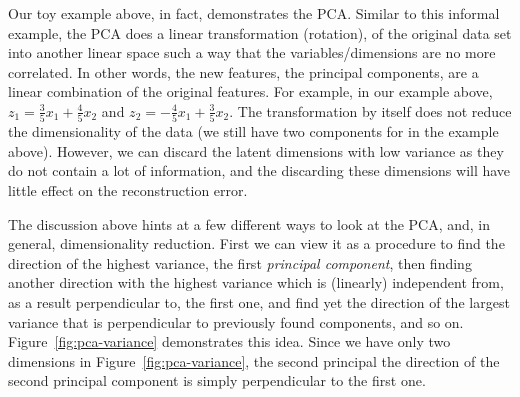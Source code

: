 Our toy example above, in fact, demonstrates the PCA.
Similar to this informal example,
the PCA does a linear transformation (rotation),
of the original data set into another linear space
such a way that the variables/dimensions are no more correlated.
In other words,
the new features, the principal components,
are a linear combination of the original features.
For example, in our example above,
$z_{1} = \frac{3}{5} x_{1} + \frac{4}{5} x_{2}$
and
$z_{2} = -\frac{4}{5} x_{1} + \frac{3}{5} x_{2}$.
The transformation by itself does not reduce the dimensionality of the data
(we still have two components for  in the example above).
However, we can discard the latent dimensions with low variance
as they do not contain a lot of information,
and the discarding these dimensions will have little effect
on the reconstruction error.

The discussion above hints at a few different ways to look at the PCA,
and, in general, dimensionality reduction.
First we can view it as a  procedure to find
the direction of the highest variance,
the first \emph{principal component},
then finding another direction with the highest variance
which is (linearly) independent from, as a result perpendicular to,
the first one,
and find yet the direction of the largest variance
that is perpendicular to previously found components,
and so on.
Figure~\ref{fig:pca-variance} demonstrates this idea.
Since we have only two dimensions in Figure~\ref{fig:pca-variance},
the second principal the direction of
the second principal component is simply perpendicular
to the first one.
\begin{marginfigure}
  \caption{\label{fig:pca-variance}%
    Interpretation of the PCA as finding
    the direction of the highest variance.
  }
\end{marginfigure}

